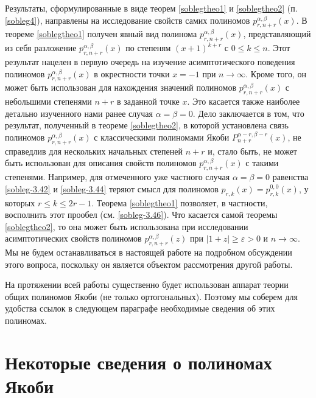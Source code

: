 Результаты, сформулированные в виде теорем \ref{soblegtheo1} и \ref{soblegtheo2} (п.\ref{sobleg4}), направлены на исследование свойств самих полиномов $p^{\alpha,\beta}_{r,n+r}(x)$.   В теореме \ref{soblegtheo1} получен явный вид полинома $p^{\alpha,\beta}_{r,n+r}(x)$, представляющий из себя разложение $p^{\alpha,\beta}_{r,n+r}(x)$ по степеням $(x+1)^{k+r}$ с $0\le k\le n$. Этот результат нацелен в первую очередь на изучение асимптотического поведения полиномов  $p^{\alpha,\beta}_{r,n+r}(x)$  в окрестности точки $x=-1$ при $n\to\infty$. Кроме того, он может быть использован для нахождения значений полиномов $p^{\alpha,\beta}_{r,n+r}(x)$ с небольшими степенями $n+r$ в заданной точке $x$. Это касается также наиболее детально изученного нами ранее случая $\alpha=\beta=0$.  Дело заключается в том, что результат, полученный в теореме \ref{soblegtheo2}, в которой установлена связь полиномов $p^{\alpha,\beta}_{r,n+r}(x)$ с классическими полиномами Якоби $P_{n+r}^{\alpha-r,\beta-r}(x)$, не справедлив для нескольких начальных степеней $n+r$ и, стало быть, не может быть использован для описания свойств полиномов $p^{\alpha,\beta}_{r,n+r}(x)$ с такими степенями. Например, для отмеченного уже частного случая $\alpha=\beta=0$ равенства \eqref{sobleg-3.42} и \eqref{sobleg-3.44} теряют смысл для полиномов $p_{r,k}(x)=p^{0,0}_{r,k}(x)$, у которых $r\le k\le 2r-1$. Теорема \ref{soblegtheo1} позволяет, в частности, восполнить этот прообел (см. \eqref{sobleg-3.46}). Что касается самой теоремы \ref{soblegtheo2}, то она может быть использована при исследовании асимптотических свойств полиномов $p^{\alpha,\beta}_{r,n+r}(z)$ при $|1+z|\ge\varepsilon>0$ и $n\to\infty$. Мы не будем останавливаться в настоящей работе на подробном обсуждении этого вопроса, поскольку он является объектом рассмотрения другой работы.

 На протяжении всей работы существенно будет использован аппарат теории общих полиномов Якоби (не только ортогональных). Поэтому мы соберем для удобства ссылок в следующем параграфе необходимые сведения об этих полиномах.

 \section{Некоторые сведения о полиномах Якоби}

